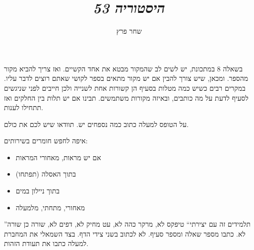 \documentclass[]{../../../../tex/classes/styledArticle}
\author{שחר פרץ}
\title{\textit{היסטוריה 53}}
\begin{document}
	\maketitle
	
	בשאלה 8 במתכונת, יש לשים לב שהמקור מבטא את אחד הקשיים. ואז צריך להביא מקור מהספר. ומכאן, שיש צורך להבין אם יש מקור מתאים בספר לקושי שאתם רוצים לדבר עליו. 
	במקרים רבים כשיש כמה מטלות בסעיף הן קשורות אחת לשנייה ולכן חייבים לפני שניגשים לסעיף לדעת על מה כותבים, ובאיזה מקורות משתמשים. תבינו אם יש תלות בין החלקים ואז תתחילו לענות. 
	
	על הטופס למעלה כתוב כמה נספחים יש. תוודאו שיש לכם את כולם. 
	
	איפה לחפש חומרים בשירותים: 
	\begin{itemize}
		\item אם יש מראות, מאחורי המראות
		\item בתוך האסלה (תפתחו)
		\item בתוך ניילון במים
		\item מאחורי, מתחתי, מלמעלה
	\end{itemize}
	
	''תלמידים זה עם יצירתי``
	טיפקס לא, מרקר כהה לא, עט מחיק לא, דפים לא, שורה כן שורה לא. כתבו מספר שאלה ומספר סעיף. לא לכתוב בשני צידי הדף. בצד השמאלי את המחברת למעלה כתבו את תעודת הזהות. 
	
\end{document}
